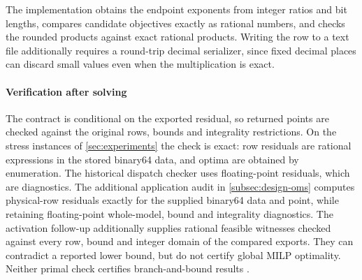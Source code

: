 The implementation obtains the endpoint exponents from integer ratios and bit lengths,
compares candidate objectives exactly as rational numbers, and checks the rounded products
against exact rational products. Writing the row to a text file additionally requires a
round-trip decimal serializer, since fixed decimal places can discard small values even when
the multiplication is exact.

\paragraph{Verification after solving}
The contract is conditional on the exported residual, so returned points are checked against
the original rows, bounds and integrality restrictions. On the stress instances of
\cref{sec:experiments} the check is exact: row residuals are rational expressions in the stored
binary64 data, and optima are obtained by enumeration. The historical dispatch checker uses
floating-point residuals, which are diagnostics. The additional application audit in
\cref{subsec:design-oms} computes physical-row residuals exactly for the supplied binary64
data and point, while retaining floating-point whole-model, bound and integrality
diagnostics. The activation follow-up additionally supplies rational feasible witnesses
checked against every row, bound and integer domain of the compared exports. They can
contradict a reported lower bound, but do not certify global MILP optimality.
Neither primal check certifies branch-and-bound results
\cite{cheung2017certificates}.
